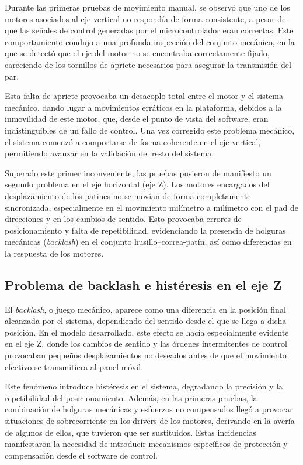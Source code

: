 Durante las primeras pruebas de movimiento manual, se observó que uno de los motores asociados al eje vertical no respondía de forma consistente, a pesar de que las señales de control generadas por el microcontrolador eran correctas. Este comportamiento condujo a una profunda inspección del conjunto mecánico, en la que se detectó que el eje del motor no se encontraba correctamente fijado, careciendo de los tornillos de apriete necesarios para asegurar la transmisión del par.

Esta falta de apriete provocaba un desacoplo total entre el motor y el sistema mecánico, dando lugar a movimientos erráticos en la plataforma, debidos a la inmovilidad de este motor, que, desde el punto de vista del software, eran indistinguibles de un fallo de control. Una vez corregido este problema mecánico, el sistema comenzó a comportarse de forma coherente en el eje vertical, permitiendo avanzar en la validación del resto del sistema.

Superado este primer inconveniente, las pruebas pusieron de manifiesto un segundo problema en el eje horizontal (eje Z). Los motores encargados del desplazamiento de los patines no se movían de forma completamente sincronizada, especialmente en el movimiento milímetro a milímetro con el pad de direcciones y en los cambios de sentido. Esto provocaba errores de posicionamiento y falta de repetibilidad, evidenciando la presencia de holguras mecánicas (\textit{backlash}) en el conjunto husillo–correa-patín, así como diferencias en la respuesta de los motores.

\subsection{Problema de backlash e histéresis en el eje Z}\label{sec:backlash}

El \textit{backlash}, o juego mecánico, aparece como una diferencia en la posición final alcanzada por el sistema, dependiendo del sentido desde el que se llega a dicha posición. En el modelo desarrollado, este efecto se hacía especialmente evidente en el eje Z, donde los cambios de sentido y las órdenes intermitentes de control provocaban pequeños desplazamientos no deseados antes de que el movimiento efectivo se transmitiera al panel móvil.

Este fenómeno introduce histéresis en el sistema, degradando la precisión y la repetibilidad del posicionamiento. Además, en las primeras pruebas, la combinación de holguras mecánicas y esfuerzos no compensados llegó a provocar situaciones de sobrecorriente en los drivers de los motores, derivando en la avería de algunos de ellos, que tuvieron que ser sustituidos. Estas incidencias manifestaron la necesidad de introducir mecanismos específicos de protección y compensación desde el software de control.

